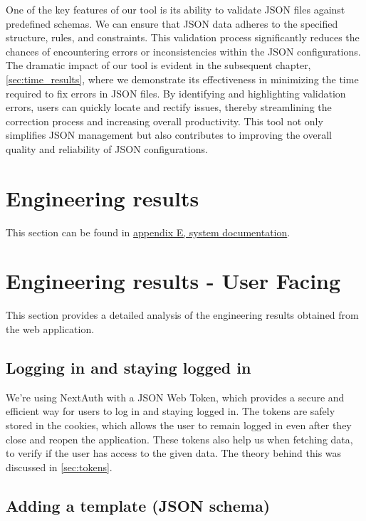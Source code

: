 \noindent
One of the key features of our tool is its ability to validate JSON files against predefined schemas. We can ensure that JSON data adheres to the specified structure, rules, and constraints. This validation process significantly reduces the chances of encountering errors or inconsistencies within the JSON configurations. \\

\noindent
The dramatic impact of our tool is evident in the subsequent chapter, \autoref{sec:time_results}, where we demonstrate its effectiveness in minimizing the time required to fix errors in JSON files. By identifying and highlighting validation errors, users can quickly locate and rectify issues, thereby streamlining the correction process and increasing overall productivity. This tool not only simplifies JSON management but also contributes to improving the overall quality and reliability of JSON configurations. \\

\section{Engineering results}

This section can be found in \hyperref[chap:system-documentation]{appendix E, system documentation}. \\

\section{Engineering results - User Facing}

This section provides a detailed analysis of the engineering results obtained from the web application. 

\subsection{Logging in and staying logged in}

We're using NextAuth with a JSON Web Token, which provides a secure and efficient way for users to log in and staying logged in. The tokens are safely stored in the cookies, which allows the user to remain logged in even after they close and reopen the application. These tokens also help us when fetching data, to verify if the user has access to the given data. The theory behind this was discussed in \autoref{sec:tokens}. 

\subsection{Adding a template (JSON schema)}


